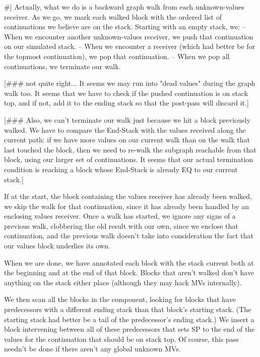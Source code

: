 \#|
Actually, what we do is a backward graph walk from each unknown-values
receiver.   As we go, we mark each walked block with the ordered list of
continuations we believe are on the stack.  Starting with an empty stack, we:
 -- When we encounter another unknown-values receiver, we push that
    continuation on our simulated stack.
 -- When we encounter a receiver (which had better be for the topmost
    continuation), we pop that continuation.
 -- When we pop all continuations, we terminate our walk.

[\#\#\# not quite right...  It seems we may run into "dead values" during the
graph walk too.  It seems that we have to check if the pushed continuation is
on stack top, and if not, add it to the ending stack so that the post-pass will
discard it.]



[\#\#\# Also, we can't terminate our walk just because we hit a block previously
walked.  We have to compare the End-Stack with the values received along
the current path: if we have more values on our current walk than on the walk
that last touched the block, then we need to re-walk the subgraph reachable
from that block, using our larger set of continuations.  It seems that our
actual termination condition is reaching a block whose End-Stack is already EQ
to our current stack.]





If at the start, the block containing the values receiver has already been
walked, we skip the walk for that continuation, since it has already been
handled by an enclosing values receiver.  Once a walk has started, we
ignore any signs of a previous walk, clobbering the old result with our own,
since we enclose that continuation, and the previous walk doesn't take into
consideration the fact that our values block underlies its own.

When we are done, we have annotated each block with the stack current both at
the beginning and at the end of that block.  Blocks that aren't walked don't
have anything on the stack either place (although they may hack MVs
internally).  

We then scan all the blocks in the component, looking for blocks that have
predecessors with a different ending stack than that block's starting stack.
(The starting stack had better be a tail of the predecessor's ending stack.)
We insert a block intervening between all of these predecessors that sets SP to
the end of the values for the continuation that should be on stack top.  Of
course, this pass needn't be done if there aren't any global unknown MVs.

